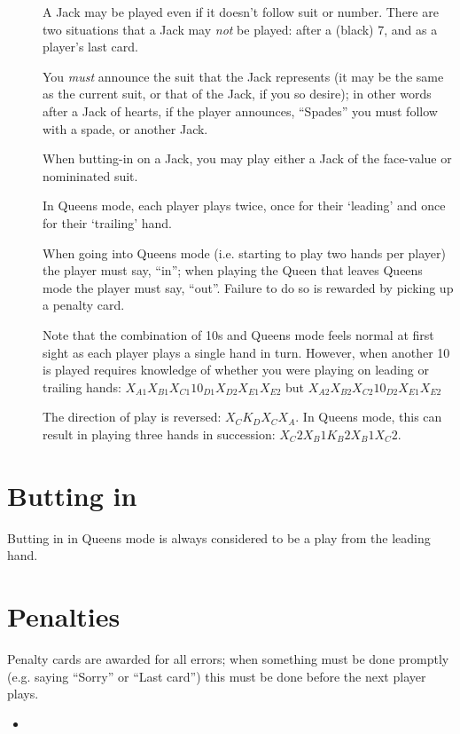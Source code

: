\documentclass[12pt]{article}
\begin{document}
\begin{description}
  \item[]
    A Jack may be played even if it doesn't follow suit or number.  There are two situations
    that a Jack may \emph{not} be played:  after a (black) 7, and as a player's last card.

    You \emph{must} announce the suit that the Jack represents (it may be the same as the
    current suit, or that of the Jack, if you so desire);  in other words after a Jack of
    hearts, if the player announces, ``Spades'' you must follow with a spade, or another Jack.

    When butting-in on a Jack, you may play either a Jack of the face-value or nomininated suit.

  \item[]
    In Queens mode, each player plays twice, once for their `leading' and once for their
    `trailing' hand.

    When going into Queens mode (i.e. starting to play two hands per player) the player must say, ``in''; when playing
    the Queen that leaves Queens mode the player must say, ``out''.  Failure to do so is rewarded by picking up a
    penalty card.

    Note that the combination of 10s and Queens mode feels normal at first sight as each player plays a single hand in
    turn.  However, when another 10 is played requires knowledge of whether you were playing on leading or trailing
    hands: $X_{A1} X_{B1} X_{C1} 10_{D1} X_{D2} X_{E1} X_{E2}$ but $X_{A2} X_{B2} X_{C2} 10_{D2} X_{E1} X_{E2}$

  \item[]
    The direction of play is reversed: $X_C K_D X_C X_A$.  In Queens mode, this can result in playing
    three hands in succession: $X_C2 X_B1 K_B2 X_B1 X_C2$.

\end{description}

\section{Butting in}
\label{buttingIn}

    Butting in in Queens mode is always considered to be a play from the leading hand.

\section{Penalties}
\label{penalties}

Penalty cards are awarded for all errors;  when something must be done promptly (e.g. saying ``Sorry'' or
``Last card'') this must be done before the next player plays.

\begin{itemize}
  \item 
\end{itemize}
\end{document}
